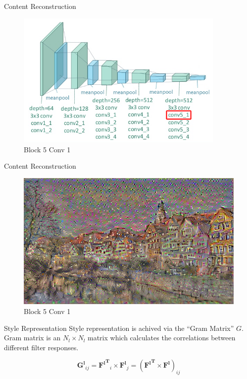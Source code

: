 \documentclass{beamer}
\begin{document}
\begin{frame}{Content Reconstruction}
\begin{figure}[ht]
\centering
\caption*{Block 5 Conv 1}
\includegraphics[width=0.9\textwidth]{img/vgg19/content/block5_conv1}
\end{figure}
\end{frame}
\begin{frame}{Content Reconstruction}
\begin{figure}[ht]
\centering
\caption*{Block 5 Conv 1}
\includegraphics[width=\textwidth]{img/content/block5_conv1.png}
\end{figure}
\end{frame}



\begin{frame}{Style Representation}
Style representation is achived via the ``Gram Matrix'' $G$. Gram matrix is
an $N_l \times N_l$ matrix which calculates the correlations between
different filter responses.

\begin{equation}
    \mathbf{G^l}_{ij} = \mathbf{{F^l}^T}_i \times \mathbf{F^l}_j
    = (\mathbf{{F^l}^T} \times \mathbf{F^l})_{ij}
\end{equation}
\end{frame}
\end{document}
